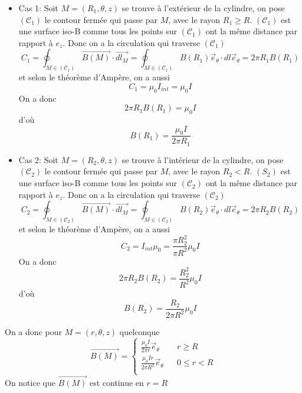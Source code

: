 \documentclass[a4paper,12pt]{book}
\begin{document}
\begin{itemize}
    \item Cas 1: Soit $M=(R_1,\theta,z)$ se trouve à l'extérieur de la cylindre, on pose $(\mathscr{C}_1)$ le contour fermée qui passe par $M$, avec le rayon $R_1\geq R$. 
    $(\mathscr{C}_1)$ est une surface iso-B comme tous les points sur $(\mathscr{C}_1)$ ont la même distance par rapport à $e_z$. 
    Donc on a la circulation qui traverse $(\mathscr{C}_1)$
    $$
    C_1=\oint_{M \in (\mathscr{C}_1)} \overrightarrow{B(M)}\cdot \overrightarrow{dl_M}=\oint_{M \in (\mathscr{C}_1)} B(R_1)\vec{e}_\theta \cdot dl\vec{e}_\theta=2\pi R_1B(R_1)
    $$
    et selon le théorème d'Ampère, on a aussi
    $$
    C_1=\mu_0 I_{int}=\mu_0 I
    $$
    On a donc 
    $$
    2\pi R_1 B(R_1)=\mu_0 I
    $$
    d'où
    $$
    \boxed{B(R_1)=\frac{\mu_0 I}{2\pi R_1}}
    $$
    \item Cas 2: Soit $M=(R_2,\theta,z)$ se trouve à l'intérieur de la cylindre, on pose $(\mathscr{C}_2)$ le contour fermée qui passe par $M$, avec le rayon $R_2 < R$. 
    $(S_2)$ est une surface iso-B comme tous les points sur $(\mathscr{C}_2)$ ont la même distance par rapport à $e_z$. 
    Donc on a la circulation qui traverse $(\mathscr{C}_2)$
    $$
    C_2=\oint_{M \in (\mathscr{C}_2)} \overrightarrow{B(M)}\cdot \overrightarrow{dl_M}=\oint_{M \in (\mathscr{C}_2)} B(R_2)\vec{e}_\theta\cdot dl\vec{e}_\theta=2\pi R_2B(R_2)
    $$
    et selon le théorème d'Ampère, on a aussi
    $$
    C_2=I_{int}\mu_0=\frac{\pi R_2^2}{\pi R^2}\mu_0 I
    $$
    On a donc 
    $$
    2\pi R_2B(R_2)=\frac{ R_2^2}{ R^2}\mu_0 I
    $$
    d'où
    $$
    \boxed{B(R_2)=\frac{R_2}{2\pi R^2}\mu_0 I}
    $$
\end{itemize}
On a donc pour $M=(r,\theta,z)$ quelconque
\begin{equation}  \nonumber
    \boxed{\overrightarrow{B(M)}=\left\{  
                 \begin{array}{rcl}  
                    \frac{\mu_0 I}{2\pi r}\vec{e}_\theta & & r \geq R\\
                    \frac{\mu_0 I r}{2\pi R^2}\vec{e}_\theta & & 0\leq r<R\\
                 \end{array}  
    \right.  }
\end{equation}
On notice que $\overrightarrow{B(M)}$ est continue en $r=R$
\end{document}
